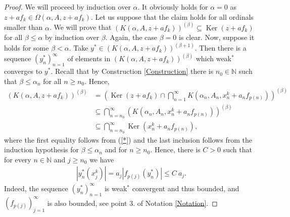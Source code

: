 \documentclass{amsart}
\theoremstyle{definition}
\begin{document}
\begin{proof}
    We will proceed by induction over $\alpha$. It obviously holds for $\alpha = 0$ as $z + af_k \in \Omega(\alpha,A,z + af_k)$. Let us suppose that the claim holds for all ordinals smaller than $\alpha$. We will prove that $\left(K(\alpha,A,z + a f_k) \right)^{(\beta)} \subseteq \operatorname{Ker}(z + a f_k)$ for all $\beta \leq \alpha$ by induction over $\beta$. Again, the case $\beta = 0$ is clear. Now, suppose it holds for some $\beta < \alpha$. Take $y^* \in \left(K(\alpha,A,z + a f_k) \right)^{(\beta+1)}$. Then there is a sequence $(y_n^*)_{n=1}^\infty$ of elements in $\left(K(\alpha,A,z + a f_k) \right)^{(\beta)}$ which weak$^*$ converges to $y^*$. Recall that by Construction \ref{Construction} there is $n_0 \in \mathbb{N}$ such that $\beta \leq \alpha_n$ for all $n \geq n_0$. Hence,
    \begin{align*}
        \left(K(\alpha,A,z + a f_k) \right)^{(\beta)} &= \left(\operatorname{Ker}(z + a f_k) \cap \bigcap_{n=1}^\infty K(\alpha_n,A_n,x^k_n + a_n f_{p(n)}) \right)^{(\beta)} \\
        &\subseteq \bigcap_{n=n_0}^\infty \left( K(\alpha_n,A_n,x^k_n + a_n f_{p(n)}) \right)^{(\beta)} \\
        &\subseteq \bigcap_{n=n_0}^\infty \operatorname{Ker} (x^k_n + a_n f_{p(n)}),
    \end{align*}
    where the first equality follows from (\ref{*}) and the last inclusion follows from the induction hypothesis for $\beta \leq \alpha_n$ and for $n \geq n_0$. Hence, there is $C>0$ such that for every $n \in \mathbb{N}$ and $j \geq n_0$ we have
    \begin{align} \label{Eq1}
        |y_n^*(x_j^k)| = a_j |f_{p(j)}(y_n^*)| \leq C \: a_j.
    \end{align}
    Indeed, the sequence $(y_n^*)_{n=1}^\infty$ is weak$^*$ convergent and thus bounded, and $(f_{p(j)})_{j=1}^\infty$ is also bounded, see point 3. of Notation \ref{Notation}.
    

\end{proof}
\end{document}
